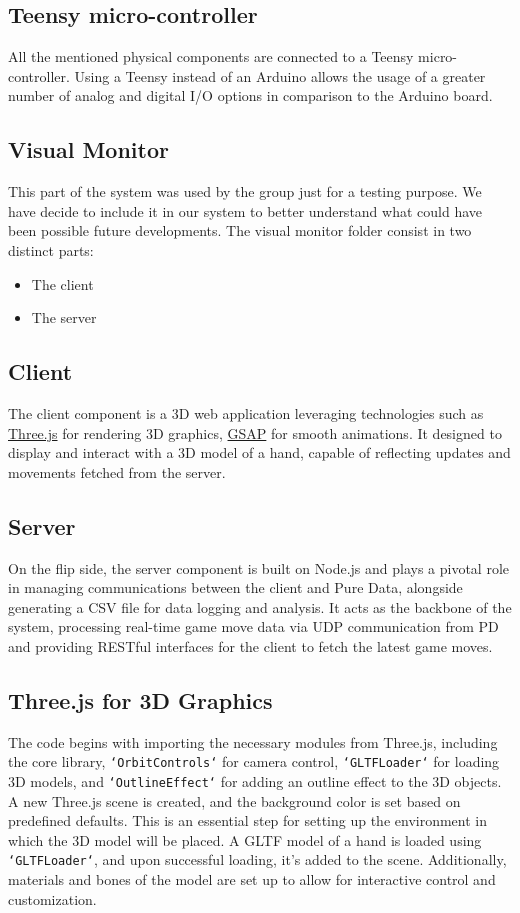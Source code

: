 \documentclass[11pt,a4paper]{report}
\begin{document}
\subsection*{Teensy micro-controller}
All the mentioned physical components are connected to a Teensy micro-controller. Using a Teensy instead of an Arduino allows the usage of a greater number of analog and digital I/O options in comparison to the Arduino board. 

\subsection*{Visual Monitor}
This part of the system was used by the group just for a testing purpose. We have decide to include it in our system to better understand what could have been possible future developments.
The visual monitor folder consist in two distinct parts:
\begin{itemize}
  \item The client
  \item The server
\end{itemize}
\subsection*{Client}
The client component is a 3D web application leveraging technologies such as \href{https://threejs.org/}{Three.js} for rendering 3D graphics, \href{https://gsap.com/}{GSAP} for smooth animations. It designed to display and interact with a 3D model of a hand, capable of reflecting updates and movements fetched from the server.

\subsection*{Server}
On the flip side, the server component is built on Node.js and plays a pivotal role in managing communications between the client and Pure Data, alongside generating a CSV file for data logging and analysis. It acts as the backbone of the system, processing real-time game move data via UDP communication from PD and providing RESTful interfaces for the client to fetch the latest game moves.

\subsection*{Three.js for 3D Graphics}
The code begins with importing the necessary modules from Three.js, including the core library, \texttt{`OrbitControls`} for camera control, \texttt{`GLTFLoader`} for loading 3D models, and \texttt{`OutlineEffect`} for adding an outline effect to the 3D objects.
A new Three.js scene is created, and the background color is set based on predefined defaults. This is an essential step for setting up the environment in which the 3D model will be placed.
A GLTF model of a hand is loaded using \texttt{`GLTFLoader`}, and upon successful loading, it's added to the scene. Additionally, materials and bones of the model are set up to allow for interactive control and customization.
\end{document}
